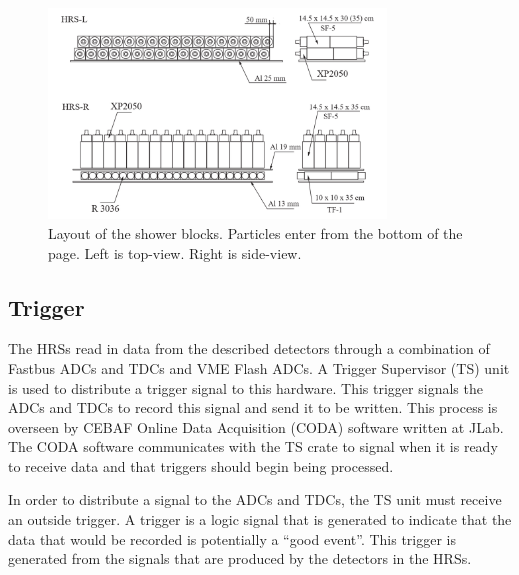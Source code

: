 \begin{figure}
\begin{center}
	\includegraphics[width=0.8\textwidth]{./setup/fig/shower_layout.png}
	\caption{Layout of the shower blocks. Particles enter from the bottom of the page. Left is top-view. Right is side-view. \cite{HANIM}}
	\label{shower_layout}
\end{center}
\end{figure}

\subsection{Trigger}

The HRSs read in data from the described detectors through a combination of Fastbus ADCs and TDCs and VME Flash ADCs. A Trigger Supervisor (TS) unit is used to distribute a trigger signal to this hardware. This trigger signals the ADCs and TDCs to record this signal and send it to be written. This process is overseen by CEBAF Online Data Acquisition (CODA) software written at JLab. The CODA software communicates with the TS crate to signal when it is ready to receive data and that triggers should begin being processed.

In order to distribute a signal to the ADCs and TDCs, the TS unit must receive an outside trigger. A trigger is a logic signal that is generated to indicate that the data that would be recorded is potentially a ``good event''. This trigger is generated from the signals that are produced by the detectors in the HRSs.


